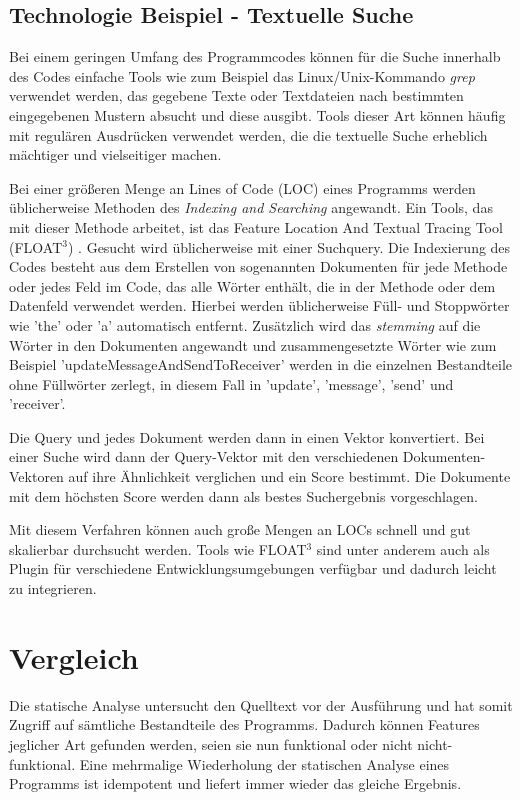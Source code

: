 \documentclass[runningheads,a4paper]{llncs}
\begin{document}
\subsection*{Technologie Beispiel - Textuelle Suche}

Bei einem geringen Umfang des Programmcodes können für die Suche innerhalb des Codes einfache Tools wie zum Beispiel das Linux/Unix-Kommando \textit{grep} verwendet werden, das gegebene Texte oder Textdateien nach bestimmten eingegebenen Mustern absucht und diese ausgibt. Tools dieser Art können häufig mit regulären Ausdrücken verwendet werden, die die textuelle Suche erheblich mächtiger und vielseitiger machen.

Bei einer größeren Menge an Lines of Code (LOC) eines Programms werden üblicherweise Methoden des \textit{Indexing and Searching} angewandt. Ein Tools, das mit dieser Methode arbeitet, ist das Feature Location And Textual Tracing Tool (FLOAT$^3$) \cite{textual}. Gesucht wird üblicherweise mit einer Suchquery. Die Indexierung des Codes besteht aus dem Erstellen von sogenannten Dokumenten für jede Methode oder jedes Feld im Code, das alle Wörter enthält, die in der Methode oder dem Datenfeld verwendet werden. Hierbei werden üblicherweise Füll- und Stoppwörter wie 'the' oder 'a' automatisch entfernt.
 Zusätzlich wird das \textit{stemming} auf die Wörter in den Dokumenten angewandt und zusammengesetzte Wörter wie zum Beispiel \mbox{'updateMessageAndSendToReceiver'} werden in die einzelnen Bestandteile ohne Füllwörter zerlegt, in diesem Fall in 'update', 'message', 'send' und 'receiver'.
 
 Die Query und jedes Dokument werden dann in einen Vektor konvertiert. Bei einer Suche wird dann der Query-Vektor mit den verschiedenen Dokumenten-Vektoren auf ihre Ähnlichkeit verglichen und ein Score bestimmt. Die Dokumente mit dem höchsten Score werden dann als bestes Suchergebnis vorgeschlagen.
 
Mit diesem Verfahren können auch große Mengen an LOCs schnell und gut skalierbar durchsucht werden. Tools wie FLOAT$^3$ sind unter anderem auch als Plugin für verschiedene Entwicklungsumgebungen verfügbar und dadurch leicht zu integrieren.

\section{Vergleich}

Die statische Analyse untersucht den Quelltext vor der Ausführung und hat somit Zugriff auf sämtliche Bestandteile des Programms. Dadurch können Features jeglicher Art gefunden werden, seien sie nun funktional oder nicht nicht-funktional. Eine mehrmalige Wiederholung der statischen Analyse eines
Programms ist idempotent und liefert immer wieder das gleiche Ergebnis.
\end{document}
